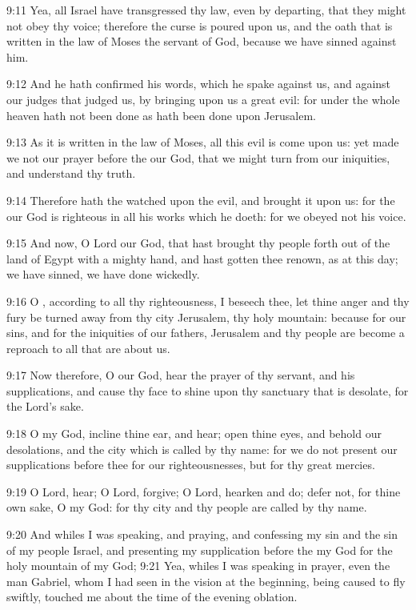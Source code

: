 9:11 Yea, all Israel have transgressed thy law, even by departing,
that they might not obey thy voice; therefore the curse is poured upon
us, and the oath that is written in the law of Moses the servant of
God, because we have sinned against him.

9:12 And he hath confirmed his words, which he spake against us, and
against our judges that judged us, by bringing upon us a great evil:
for under the whole heaven hath not been done as hath been done upon
Jerusalem.

9:13 As it is written in the law of Moses, all this evil is come upon
us: yet made we not our prayer before the \LORD our God, that we might
turn from our iniquities, and understand thy truth.

9:14 Therefore hath the \LORD watched upon the evil, and brought it
upon us: for the \LORD our God is righteous in all his works which he
doeth: for we obeyed not his voice.

9:15 And now, O Lord our God, that hast brought thy people forth out
of the land of Egypt with a mighty hand, and hast gotten thee renown,
as at this day; we have sinned, we have done wickedly.

9:16 O \LORD, according to all thy righteousness, I beseech thee, let
thine anger and thy fury be turned away from thy city Jerusalem, thy
holy mountain: because for our sins, and for the iniquities of our
fathers, Jerusalem and thy people are become a reproach to all that
are about us.

9:17 Now therefore, O our God, hear the prayer of thy servant, and his
supplications, and cause thy face to shine upon thy sanctuary that is
desolate, for the Lord's sake.

9:18 O my God, incline thine ear, and hear; open thine eyes, and
behold our desolations, and the city which is called by thy name: for
we do not present our supplications before thee for our
righteousnesses, but for thy great mercies.

9:19 O Lord, hear; O Lord, forgive; O Lord, hearken and do; defer not,
for thine own sake, O my God: for thy city and thy people are called
by thy name.

9:20 And whiles I was speaking, and praying, and confessing my sin and
the sin of my people Israel, and presenting my supplication before the
\LORD my God for the holy mountain of my God; 9:21 Yea, whiles I was
speaking in prayer, even the man Gabriel, whom I had seen in the
vision at the beginning, being caused to fly swiftly, touched me about
the time of the evening oblation.

